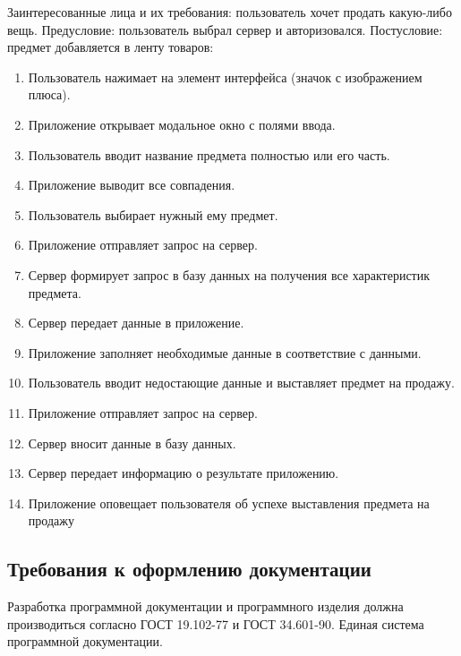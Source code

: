 Заинтересованные лица и их требования: пользователь хочет продать какую-либо вещь.
Предусловие: пользователь выбрал сервер и авторизовался.
Постусловие: предмет добавляется в ленту товаров:
\begin{enumerate}
	\item Пользователь нажимает на элемент интерфейса (значок с изображением плюса).
	\item Приложение открывает модальное окно с полями ввода.
	\item Пользователь вводит название предмета полностью или его часть.
	\item Приложение выводит все совпадения.
	\item Пользователь выбирает нужный ему предмет.
	\item Приложение отправляет запрос на сервер.
	\item Сервер формирует запрос в базу данных на получения все характеристик предмета.
	\item Сервер передает данные в приложение.
	\item Приложение заполняет необходимые данные в соответствие с данными.
	\item Пользователь вводит недостающие данные и выставляет предмет на продажу.
	\item Приложение отправляет запрос на сервер.
	\item Сервер вносит данные в базу данных.
	\item Сервер передает информацию о результате приложению.
	\item Приложение оповещает пользователя об успехе выставления предмета на продажу
\end{enumerate}

\subsection{Требования к оформлению документации}

Разработка программной документации и программного изделия должна производиться согласно ГОСТ 19.102-77 и ГОСТ 34.601-90. Единая система программной документации.
